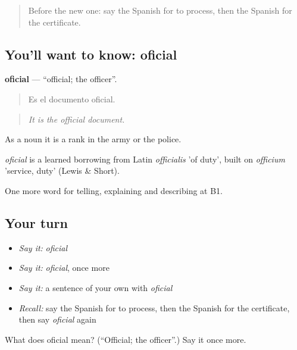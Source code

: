\label{lesson:ES-C624-oficial}



\begin{quote}
Before the new one: say the Spanish for to process, then the Spanish for the certificate.
\end{quote}

\subsection*{You'll want to know: oficial}
\textbf{oficial} — \textquotedblleft{}official; the officer\textquotedblright{}.

\begin{quote}
Es el documento oficial.
\end{quote}

\begin{quote}
\emph{It is the official document.}
\end{quote}

As a noun it is a rank in the army or the police.

\begin{cousinweb}
\emph{oficial} is a learned borrowing from Latin \emph{officialis} 'of duty', built on \emph{officium} 'service, duty' (Lewis \& Short).
\end{cousinweb}

\begin{grammarlens}[title={What you've built}]
One more word for telling, explaining and describing at B1.
\end{grammarlens}

\subsection*{Your turn}
\begin{itemize}
\raggedright
  \item \emph{Say it:} \emph{oficial}
  \item \emph{Say it:} \emph{oficial}, once more
  \item \emph{Say it:} a sentence of your own with \emph{oficial}
  \item \emph{Recall:} say the Spanish for to process, then the Spanish for the certificate, then say \emph{oficial} again
\end{itemize}

\begin{tcolorbox}[breakable,colback=teal!4,colframe=teal!35!black,title={Before you move on}]
What does oficial mean? (\textquotedblleft{}Official; the officer\textquotedblright{}.) Say it once more.
\end{tcolorbox}
